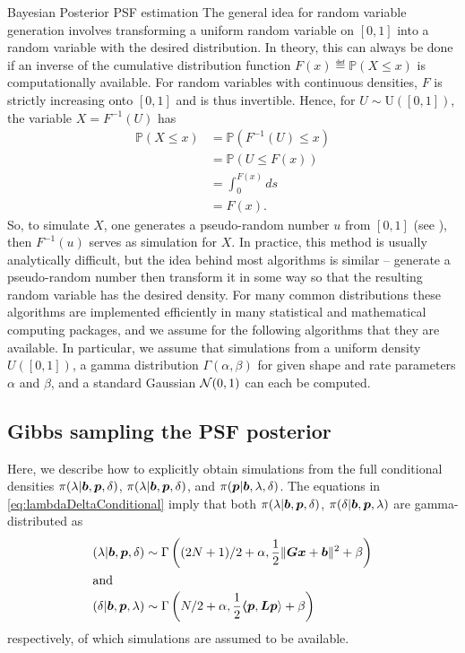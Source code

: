 \begin{chapter}{Bayesian Posterior PSF estimation}
The general idea for random variable generation involves transforming a uniform random variable on $[0,1]$ into a random variable with the desired distribution.
In theory, this can always be done if an inverse of the cumulative distribution function $F(x) \eqdef \mathbb P(X \le x)$ is computationally available.
For random variables with continuous densities, $F$ is strictly increasing onto $[0,1]$ and is thus invertible.  
Hence, for $U\sim \mathrm{U([0,1])}$, the variable $X = F^{-1}(U)$ has 
\begin{align}
  \mathbb P( X \le x) 
  &= \mathbb P( F^{-1}(U)\le  x ) \nonumber \\
  &= \mathbb P( U \le F(x) )\nonumber\\
  &= \int_0^{F(x)}ds\nonumber\\
  &= F(x).
\end{align}
So, to simulate $X$, one generates a pseudo-random number $u$ from $[0,1]$ (see \citep{knuthart1981}), then $F^{-1}(u)$ serves as simulation for $X$.
In practice, this method is usually analytically difficult, but the idea behind most algorithms is similar -- generate a pseudo-random number then transform it in some way so that the resulting random variable has the desired density.
For many common distributions these algorithms are implemented efficiently in many statistical and mathematical computing packages, and we assume for the following algorithms that they are available.
In particular, we assume that simulations from a uniform density $U([0,1])$, a gamma distribution $\Gamma(\alpha,\beta)$ for given shape and rate parameters $\alpha$ and $\beta$, and a standard Gaussian $\mathcal{N}(0,1)$ can each be computed.

\subsection{Gibbs sampling the PSF posterior}

Here, we describe how to explicitly obtain simulations from the full conditional densities $\pi(\lambda|\mbox{\boldmath$b$},\mbox{\boldmath$p$},\delta)$, $\pi(\lambda|\mbox{\boldmath$b$},\mbox{\boldmath$p$},\delta)$, and $\pi(\mbox{\boldmath$p$}|\mbox{\boldmath$b$},\lambda,\delta)$.
The equations in \eqref{eq:lambdaDeltaConditional} imply that both $\pi(\lambda|\mbox{\boldmath$b$},\mbox{\boldmath$p$},\delta)$, $\pi(\delta|\mbox{\boldmath$b$},\mbox{\boldmath$p$},\lambda)$ are gamma-distributed as
\begin{align}
  (\lambda|\mbox{\boldmath$b$},\mbox{\boldmath$p$},\delta) &\sim \Gamma\left((2N+1)/2+\alpha,\frac{1}{2}\|\mbox{\boldmath$Gx$} + \mbox{\boldmath$b$}\|^2 + \beta\right)\\
  \intertext{and}
  (\delta|\mbox{\boldmath$b$},\mbox{\boldmath$p$},\lambda) &\sim \Gamma\left(N/2+\alpha,\frac{1}{2}\mbox{\boldmath$\langle$} \mbox{\boldmath$p$},\mbox{\boldmath$L$}\mbox{\boldmath$p$} \rangle+ \beta\right)
\end{align}
respectively, of which simulations are assumed to be available.


\end{chapter}
